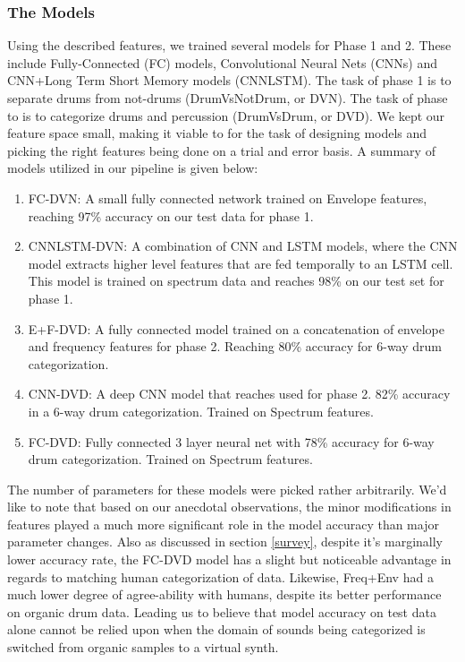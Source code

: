 \documentclass{nime-alternate} %
\begin{document}
\subsubsection{The Models}
Using the described features, we trained several models for Phase 1 and 2. These include Fully-Connected (FC) models, Convolutional Neural Nets (CNNs) and CNN+Long Term Short Memory models (CNNLSTM). The task of phase 1 is to separate drums from not-drums (DrumVsNotDrum, or DVN). The task of phase to is to categorize drums and percussion (DrumVsDrum, or DVD). We kept our feature space small, making it viable to for the task of designing models and picking the right features being done on a trial and error basis. A summary of models utilized in our pipeline is given below:
\begin {enumerate}
\item FC-DVN: A small fully connected network trained on Envelope features, reaching 97\% accuracy on our test data for phase 1. 
\item CNNLSTM-DVN: A combination of CNN and LSTM models, where the CNN model extracts higher level features that are fed temporally to an LSTM cell. This model is trained on spectrum data and reaches 98\% on our test set for phase 1.
\item E+F-DVD: A fully connected model trained on a concatenation of envelope and frequency features for phase 2. Reaching 80\% accuracy for 6-way drum categorization.
\item CNN-DVD: A deep CNN model that reaches used for phase 2. 82\% accuracy in a 6-way drum categorization. Trained on Spectrum features.
\item FC-DVD: Fully connected 3 layer neural net with 78\% accuracy for 6-way drum categorization. Trained on Spectrum features.
\end{enumerate}
The number of parameters for these models were picked rather arbitrarily. We'd like to note that based on our anecdotal observations, the minor modifications in features played a much more significant role in the model accuracy than major parameter changes. Also as discussed in section \ref{survey}, despite it's marginally lower accuracy rate, the FC-DVD model has a slight but noticeable advantage in regards to matching human categorization of data. Likewise, Freq+Env had a much lower degree of agree-ability with humans, despite its better performance on organic drum data. Leading us to believe that model accuracy on test data alone cannot be relied upon when the domain of sounds being categorized is switched from organic samples to a virtual synth. \\
\end{document}
